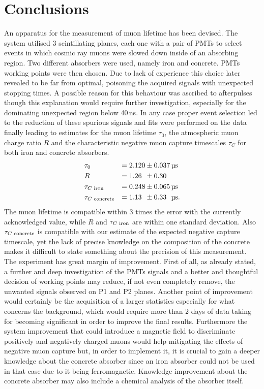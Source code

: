 \documentclass[../main.tex]{subfiles}
\begin{document}
\section{Conclusions}

An apparatus for the measurement of muon lifetime has been devised. The system utilised 3 scintillating planes, each one with a pair of PMTs to select events in which cosmic ray muons were slowed down inside of an absorbing region. Two different absorbers were used, namely iron and concrete. PMTs working points were then chosen. Due to lack of experience this choice later revealed to be far from optimal, poisoning the acquired signals with unexpected stopping times. A possible reason for this behaviour was ascribed to afterpulses though this explanation would require further investigation, especially for the dominating unexpected region below 40\,ns. In any case proper event selection led to the reduction of these spurious signals and fits were performed on the data finally leading to estimates for the muon lifetime $\tau_0$, the atmospheric muon charge ratio $R$ and the characteristic negative muon capture timescales $\tau_C$ for both iron and concrete absorbers.
\begin{alignat*}{3}
    &\tau_0 &=2.120&\pm 0.037\, \si{\micro \second} \\
    &R & =1.26\phantom{0}&\pm 0.30 \\
    &\tau_{C\textnormal{ iron}} & =0.248&\pm 0.065\, \si{\micro \second} \\%
    &\tau_{C\textnormal{ concrete}} & =1.13\phantom{3}&\pm 0.33\phantom{3}\, \si{\micro \second}.
\end{alignat*}
The muon lifetime is compatible within 3 times the error with the currently acknowledged value, while $R$ and $\tau_{C\textnormal{ iron}}$ are within one standard deviation. Also $\tau_{C\textnormal{ concrete}}$ is compatible with our estimate of the expected negative capture timescale, yet the lack of precise knowledge on the composition of the concrete makes it difficult to state something about the precision of this measurement.\\

The experiment has great margin of improvement. First of all, as already stated, a further and deep investigation of the PMTs signals and a better and thoughtful decision of working points may reduce, if not even completely remove, the unwanted signals observed on P1 and P2 planes. Another point of improvement would certainly be the acquisition of a larger statistics especially for what concerns the background, which would require more than 2 days of data taking for becoming significant in order to improve the final results. Furthermore the system improvement that could introduce a magnetic field to discriminate positively and negatively charged muons would help mitigating the effects of negative muon capture but, in order to implement it, it is crucial to gain a deeper knowledge about the concrete absorber since an iron absorber could not be used in that case due to it being ferromagnetic. Knowledge improvement about the concrete absorber may also include a chemical analysis of the absorber itself.
\end{document}
